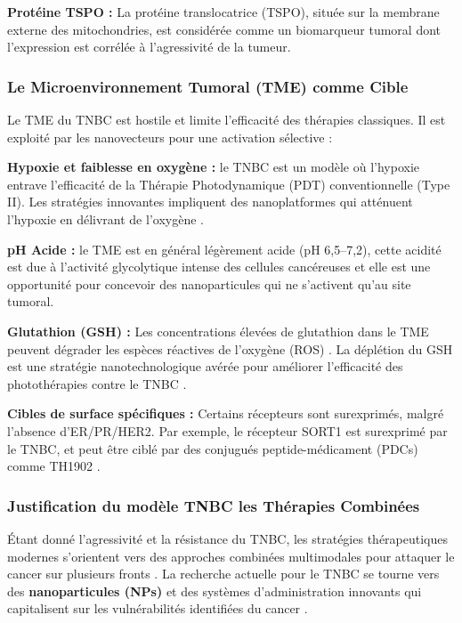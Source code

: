 \textbf{Protéine TSPO :} La protéine translocatrice (TSPO), située sur la membrane externe des mitochondries, est considérée comme un biomarqueur tumoral dont l'expression est corrélée à l'agressivité de la tumeur.

\subsubsection{Le Microenvironnement Tumoral (TME) comme Cible}
Le TME du TNBC est hostile et limite l'efficacité des thérapies classiques. Il est exploité par les nanovecteurs pour une activation sélective \cite{Ailioaie2025}:

\textbf{Hypoxie et faiblesse en oxygène :} le TNBC est un modèle où l'hypoxie entrave l'efficacité de la Thérapie Photodynamique (PDT) conventionnelle (Type II). Les stratégies innovantes impliquent des nanoplatformes qui atténuent l'hypoxie en délivrant de l'oxygène \cite{Ailioaie2025, Duan2024}.

\textbf{pH Acide :} le TME est en général légèrement acide (pH 6,5–7,2), cette acidité est due à l'activité glycolytique intense des cellules cancéreuses et elle est une opportunité pour concevoir des nanoparticules qui ne s'activent qu'au site tumoral\cite{Xu2025, Chao2023}.

\textbf{Glutathion (GSH) :} Les concentrations élevées de glutathion dans le TME peuvent dégrader les espèces réactives de l'oxygène (ROS) \cite{Li2025b, Ao2025}. La déplétion du GSH est une stratégie nanotechnologique avérée pour améliorer l'efficacité des photothérapies contre le TNBC \cite{Ao2025}.

\textbf{Cibles de surface spécifiques :} Certains récepteurs sont surexprimés, malgré l'absence d'ER/PR/HER2. Par exemple, le récepteur SORT1 est surexprimé par le TNBC, et peut être ciblé par des conjugués peptide-médicament (PDCs) comme TH1902 \cite{Chuang2025}.

\subsubsection{ Justification du modèle TNBC les Thérapies Combinées}
Étant donné l'agressivité et la résistance du TNBC, les stratégies thérapeutiques modernes s'orientent vers des approches combinées multimodales pour attaquer le cancer sur plusieurs fronts \cite{Ailioaie2025, Li2025, Kong_2023}.
La recherche actuelle pour le TNBC se tourne vers des \textbf{nanoparticules (NPs)} et des systèmes d'administration innovants qui capitalisent sur les vulnérabilités identifiées du cancer  \cite{Zhu2024}.

